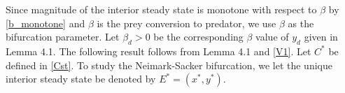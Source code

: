 \documentclass[11pt]{article}
\begin{document}




\medskip


Since  magnitude of the interior steady state is monotone with
respect to $\beta$ by \eqref{b_monotone} and $\beta$ is the prey
conversion to predator, we use $\beta$ as the bifurcation
parameter. Let $\beta_d>0$ be the corresponding $\beta$ value of
$y_d$ given in Lemma 4.1. The following result follows from Lemma
4.1 and \eqref{V1}.   Let $C^*$ be defined in \eqref{Cst}. To
study the Neimark-Sacker bifurcation, we let the unique interior
steady state be denoted by $E^*=(x^*, y^*)$.


\medskip
\end{document}
